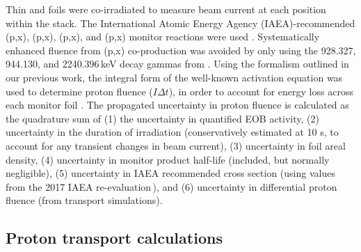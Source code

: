 Thin  and  foils  
were co-irradiated to measure beam current at each position within the stack.
The International Atomic Energy Agency (IAEA)-recommended (p,x), (p,x),  (p,x), and (p,x) monitor reactions were used 
\cite{Hermanne2018}.
Systematically enhanced fluence from (p,x) co-production was avoided by only using the 928.327, 944.130, and 2240.396\,keV decay gammas  from .
Using the formalism outlined in our previous work, the integral form of the well-known activation equation was used to  determine proton fluence ($I \Delta t $),
in order to account for energy loss across each monitor foil \cite{Voyles2018a}.
The propagated uncertainty in proton fluence is calculated as the quadrature sum of (1) the uncertainty in quantified EOB activity, (2) uncertainty in the duration of irradiation (conservatively estimated at 10 s, to account for any transient changes in beam current), (3) uncertainty in foil areal density, (4) uncertainty in monitor product half-life (included, but normally negligible), (5) uncertainty in IAEA recommended cross section (using values  from the 2017 IAEA re-evaluation\,\cite{Hermanne2018}), and (6) uncertainty in differential proton fluence (from transport simulations).






\subsection{\label{sec:proton_transport_fe}Proton transport calculations}


